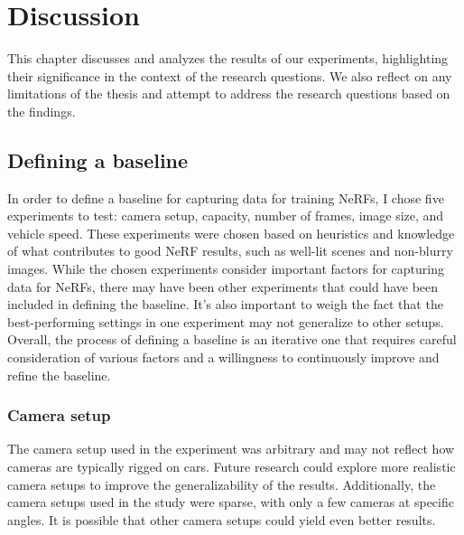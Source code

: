 \chapter{Discussion}
This chapter discusses and analyzes the results of our experiments, highlighting their significance in the context of the research questions. We also reflect on any limitations of the thesis and attempt to address the research questions based on the findings.

\section{Defining a baseline}

\begin{comment}
Points to discuss:
- Main point: Discuss the process of choosing which experiments was chosen.
- There might have been other experiments that should've been included in deciding the baseline.
- The way to choose which experiment goes forward could've been done differently.
- Although one experiment seem to do better with the current chosen setup, it might've done worse in another setup.
\end{comment}

In order to define a baseline for capturing data for training NeRFs, I chose five experiments to test: camera setup, capacity, number of frames, image size, and vehicle speed. These experiments were chosen based on heuristics and knowledge of what contributes to good NeRF results, such as well-lit scenes and non-blurry images. While the chosen experiments consider important factors for capturing data for NeRFs, there may have been other experiments that could have been included in defining the baseline. It's also important to weigh the fact that the best-performing settings in one experiment may not generalize to other setups. Overall, the process of defining a baseline is an iterative one that requires careful consideration of various factors and a willingness to continuously improve and refine the baseline.

\subsection{Camera setup}

The camera setup used in the experiment was arbitrary and may not reflect how cameras are typically rigged on cars. Future research could explore more realistic camera setups to improve the generalizability of the results. Additionally, the camera setups used in the study were sparse, with only a few cameras at specific angles. It is possible that other camera setups could yield even better results.

